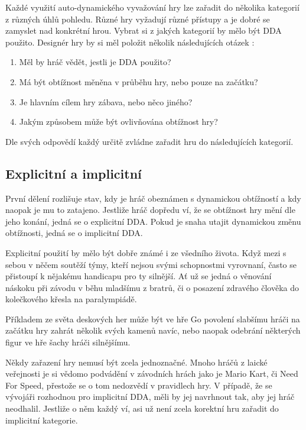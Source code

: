 Každé využití auto-dynamického vyvažování hry lze zařadit do několika kategorií z různých úhlů pohledu. Různé hry vyžadují různé přístupy a je dobré se zamyslet nad konkrétní hrou. Vybrat si z jakých kategorií by mělo být DDA použito. Designér hry by si měl položit několik následujících otázek :

\begin{enumerate}
	\item Měl by hráč vědět, jestli je DDA použito?
	\item Má být obtížnost měněna v průběhu hry, nebo pouze na začátku?
	\item Je hlavním cílem hry zábava, nebo něco jiného?
	\item Jakým způsobem může být ovlivňována obtížnost hry?
\end{enumerate}

Dle svých odpovědí každý určitě zvládne zařadit hru do následujících kategorií.

\subsection{Explicitní a implicitní}

První dělení rozlišuje stav, kdy je hráč obeznámen s dynamickou obtížností a kdy naopak je mu to zatajeno. Jestliže hráč dopředu ví, že se obtížnost hry mění dle jeho konání, jedná se o explicitní DDA. Pokud je snaha utajit dynamickou změnu obtížnosti, jedná se o implicitní DDA.

Explicitní použití by mělo být dobře známé i ze všedního života. Když mezi s sebou v něčem soutěží týmy, kteří nejsou svými schopnostmi vyrovnaní, často se přistoupí k nějakému handicapu pro ty silnější. Ať už se jedná o věnování náskoku při závodu v běhu mladšímu z bratrů, či o posazení zdravého člověka do kolečkového křesla na paralympiádě. 

Příkladem ze světa deskových her může být ve hře Go povolení slabšímu hráči na začátku hry zahrát několik svých kamenů navíc, nebo naopak odebrání některých figur ve hře šachy hráči silnějšímu.

Někdy zařazení hry nemusí být zcela jednoznačné. Mnoho hráčů z laické veřejnosti je si vědomo podvádění v závodních hrách jako je Mario Kart, či Need For Speed, přestože se o tom nedozvědí v pravidlech hry. V případě, že se vývojáři rozhodnou pro implicitní DDA, měli by jej navrhnout tak, aby jej hráč neodhalil. Jestliže o něm každý ví, asi už není zcela korektní hru zařadit do implicitní kategorie.

